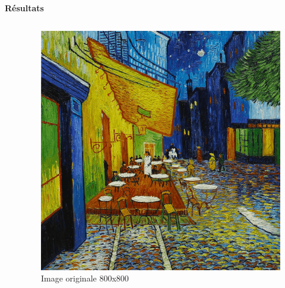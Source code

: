 \documentclass{beamer}
\begin{document}
\begin{frame}[t]
\begin{columns}[t]
\begin{column}{.5\linewidth}
                \vspace{1em}


                \begin{block}{\centering \textbf{Résultats}}
                    \vspace{.5em}

                    \begin{columns}[t]
                        \begin{column}{.25\linewidth}

                        \end{column}

                        \begin{column}{.25\linewidth}
                            \begin{figure}[t]
                                \includegraphics[width=\linewidth]{rsc/van_gogh.png}\\
                                {\small Image originale 800x800}
                            \end{figure}
                        \end{column}


\end{columns}
\end{block}
\end{column}
\end{columns}
\end{frame}
\end{document}
